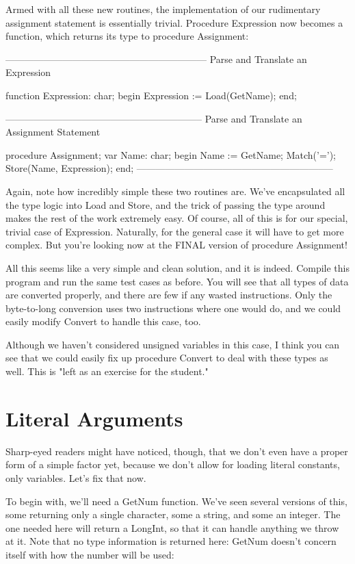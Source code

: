 \documentclass[float=false, crop=false]{standalone}
\begin{document}
Armed with all these new routines, the implementation of our rudimentary
assignment statement is essentially trivial. Procedure Expression now becomes a
function, which returns its type to procedure Assignment:


{---------------------------------------------------------------}
{ Parse and Translate an Expression }

function Expression: char;
begin
   Expression := Load(GetName);
end;


{--------------------------------------------------------------}
{ Parse and Translate an Assignment Statement }

procedure Assignment;
var Name: char;
begin
   Name := GetName;
   Match('=');
   Store(Name, Expression);
end;
{--------------------------------------------------------------}

Again, note how incredibly simple these two routines are. We've encapsulated all
the type logic into Load and Store, and the trick of passing the type around
makes the rest of the work extremely easy. Of course, all of this is for our
special, trivial case of Expression. Naturally, for the general case it will
have to get more complex. But you're looking now at the FINAL version of
procedure Assignment!

All this seems like a very simple and clean solution, and it is indeed. Compile
this program and run the same test cases as before. You will see that all types
of data are converted properly, and there are few if any wasted instructions.
Only the byte-to-long conversion uses two instructions where one would do, and
we could easily modify Convert to handle this case, too.

Although we haven't considered unsigned variables in this case, I think you can
see that we could easily fix up procedure Convert to deal with these types as
well. This is "left as an exercise for the student."


\section{Literal Arguments}

Sharp-eyed readers might have noticed, though, that we don't even have a proper
form of a simple factor yet, because we don't allow for loading literal
constants, only variables. Let's fix that now.

To begin with, we'll need a GetNum function. We've seen several versions of
this, some returning only a single character, some a string, and some an
integer. The one needed here will return a LongInt, so that it can handle
anything we throw at it. Note that no type information is returned here: GetNum
doesn't concern itself with how the number will be used:
\end{document}
